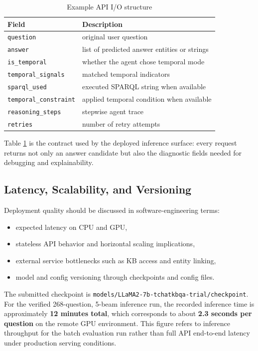 \documentclass[a4paper,11pt]{article}
\begin{document}
\begin{table}[H]
\centering
\caption{Example API I/O structure}
\label{tab:api-io}
\begin{tabular}{p{3.8cm}p{8.8cm}}
\toprule
\textbf{Field} & \textbf{Description} \\
\midrule
\texttt{question} & original user question \\
\texttt{answer} & list of predicted answer entities or strings \\
\texttt{is\_temporal} & whether the agent chose temporal mode \\
\texttt{temporal\_signals} & matched temporal indicators \\
\texttt{sparql\_used} & executed SPARQL string when available \\
\texttt{temporal\_constraint} & applied temporal condition when available \\
\texttt{reasoning\_steps} & stepwise agent trace \\
\texttt{retries} & number of retry attempts \\
\bottomrule
\end{tabular}
\end{table}

Table \ref{tab:api-io} is the contract used by the deployed inference surface: every request returns not only an answer candidate but also the diagnostic fields needed for debugging and explainability.

\subsection{Latency, Scalability, and Versioning}

Deployment quality should be discussed in software-engineering terms:

\begin{itemize}[leftmargin=1.2cm]
  \item expected latency on CPU and GPU,
  \item stateless API behavior and horizontal scaling implications,
  \item external service bottlenecks such as KB access and entity linking,
  \item model and config versioning through checkpoints and config files.
\end{itemize}

\noindent The submitted checkpoint is \texttt{models/LLaMA2-7b-tchatkbqa-trial/checkpoint}. For the verified 268-question, 5-beam inference run, the recorded inference time is approximately \textbf{12 minutes total}, which corresponds to about \textbf{2.3 seconds per question} on the remote GPU environment. This figure refers to inference throughput for the batch evaluation run rather than full API end-to-end latency under production serving conditions.
\end{document}
